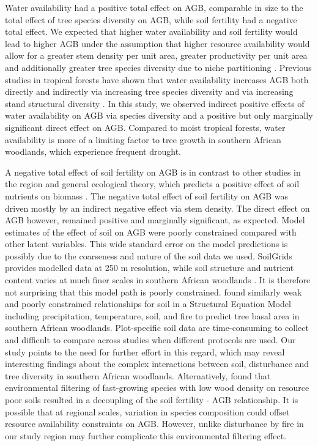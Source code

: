 \documentclass[12pt,a4paper]{article}
\begin{document}
Water availability had a positive total effect on AGB, comparable in size to the total effect of tree species diversity on AGB, while soil fertility had a negative total effect. We expected that higher water availability and soil fertility would lead to higher AGB under the assumption that higher resource availability would allow for a greater stem density per unit area, greater productivity per unit area and additionally greater tree species diversity due to niche partitioning \citep{Kraaij2006, Shirima2015}. Previous studies in tropical forests have shown that water availability increases AGB both directly and indirectly via increasing tree species diversity and via increasing stand structural diversity \citep{Ali2019a, Ali2019b, Poorter2017}. In this study, we observed indirect positive effects of water availability on AGB via species diversity and a positive but only marginally significant direct effect on AGB. Compared to moist tropical forests, water availability is more of a limiting factor to tree growth in southern African woodlands, which experience frequent drought. 

A negative total effect of soil fertility on AGB is in contrast to other studies in the region and general ecological theory, which predicts a positive effect of soil nutrients on biomass \citep{Scarascia2000}. The negative total effect of soil fertility on AGB was driven mostly by an indirect negative effect via stem density. The direct effect on AGB however, remained positive and marginally significant, as expected. Model estimates of the effect of soil on AGB were poorly constrained compared with other latent variables. This wide standard error on the model predictions is possibly due to the coarseness and nature of the soil data we used. SoilGrids provides modelled data at 250 m resolution, while soil structure and nutrient content varies at much finer scales in southern African woodlands \citep{Muledi2017, Bucini2007}. It is therefore not surprising that this model path is poorly constrained. \citet{Lehmann2014} found similarly weak and poorly constrained relationships for soil in a Structural Equation Model including precipitation, temperature, soil, and fire to predict tree basal area in southern African woodlands. Plot-specific soil data are time-consuming to collect and difficult to compare across studies when different protocols are used. Our study points to the need for further effort in this regard, which may reveal interesting findings about the complex interactions between soil, disturbance and tree diversity in southern African woodlands. Alternatively, \citet{Gourlet2011} found that environmental filtering of fast-growing species with low wood density on resource poor soils resulted in a decoupling of the soil fertility - AGB relationship. It is possible that at regional scales, variation in species composition could offset resource availability constraints on AGB. However, unlike \citet{Gourlet2011} disturbance by fire in our study region may further complicate this environmental filtering effect.
\end{document}
